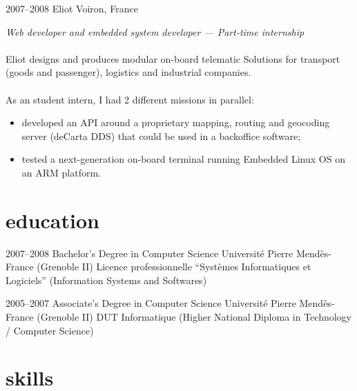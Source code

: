 \documentclass[]{friggeri-cv}
\begin{document}
\begin{entrylist}
  \entry
    {2007--2008}
    {Eliot}
    {Voiron, France}
    {
        \textit{Web developer and embedded system developer --- Part-time
        internship} \\
        \\
        Eliot designs and produces modular on-board telematic Solutions for
        transport (goods and passenger), logistics and industrial companies. \\
        \\
        As an student intern, I had 2 different missions in parallel:
        \begin{itemize}
          \item developed an API around a proprietary mapping, routing and
                geocoding server (deCarta DDS) that could be used in a
                backoffice software;
          \item tested a next-generation on-board terminal running Embedded
                Linux OS on an ARM platform.
        \end{itemize}
    }

\end{entrylist}



\section{education}

\begin{entrylist}

\entry
  {2007--2008}
  {Bachelor's Degree {\normalfont in Computer Science}}
  {Université Pierre Mendès-France (Grenoble II)}
  {
    Licence professionnelle ``Systèmes Informatiques et Logiciels''
    (Information Systems and Softwares)
  }

\entry
  {2005--2007}
  {Associate's Degree {\normalfont in Computer Science}}
  {Université Pierre Mendès-France (Grenoble II)}
  {
    DUT Informatique (Higher National Diploma in Technology / Computer
    Science)
  }

\end{entrylist}



\section{skills}
\end{document}
